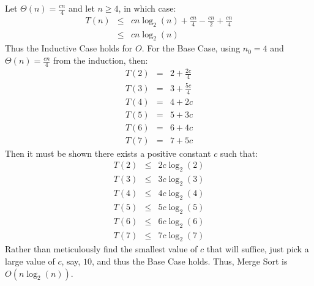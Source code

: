 \documentclass{article}
\begin{document}
Let $\Theta(n) = \frac{cn}{4}$ and let $n \geq 4$, in which case:
\begin{eqnarray*}
	T(n) &\leq& cn\log_2(n) + \frac{cn}{4} - \frac{cn}{2} + \frac{cn}{4} \\
	 &\leq& cn\log_2(n)
\end{eqnarray*}
Thus the Inductive Case holds for $O$.  For the Base Case, using $n_0 = 4$ and $\Theta(n) = \frac{cn}{4}$ from the induction, then:
\begin{eqnarray*}
	T(2) &=& 2 + \frac{2c}{4} \\
	T(3) &=& 3 + \frac{5c}{4} \\
	T(4) &=& 4 + 2c \\
	T(5) &=& 5 + 3c \\
	T(6) &=& 6 + 4c \\
	T(7) &=& 7 + 5c
\end{eqnarray*}
Then it must be shown there exists a positive constant $c$ such that:
\begin{eqnarray*}
	T(2) &\leq& 2c\log_2(2) \\
	T(3) &\leq& 3c\log_2(3) \\
	T(4) &\leq& 4c\log_2(4) \\
	T(5) &\leq& 5c\log_2(5) \\
	T(6) &\leq& 6c\log_2(6) \\
	T(7) &\leq& 7c\log_2(7)
\end{eqnarray*}
Rather than meticulously find the smallest value of $c$ that will suffice, just pick a large value of $c$, say, $10$, and thus the Base Case holds.  Thus, Merge Sort is $O(n\log_2(n))$.
\end{document}
